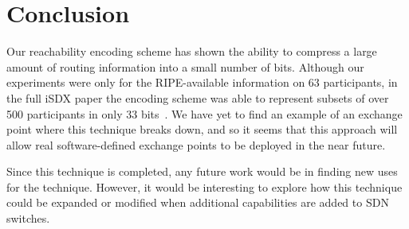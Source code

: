 \section{Conclusion}

Our reachability encoding scheme has shown the ability to compress a large amount of routing information into a small number of bits. Although our experiments were only for the RIPE-available information on 63 participants, in the full iSDX paper the encoding scheme was able to represent subsets of over 500 participants in only 33 bits~\cite{isdx}. We have yet to find an example of an exchange point where this technique breaks down, and so it seems that this approach will allow real software-defined exchange points to be deployed in the near future. 

Since this technique is completed, any future work would be in finding new uses for the technique. However, it would be interesting to explore how this technique could be expanded or modified when additional capabilities are added to SDN switches.